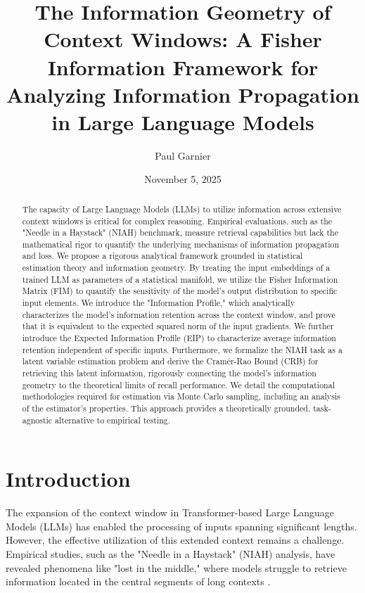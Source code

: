 \documentclass{article}
\title{The Information Geometry of Context Windows: A Fisher Information Framework for Analyzing Information Propagation in Large Language Models}
\author{Paul Garnier}
\affil{PSL}
\date{November 5, 2025}
\theoremstyle{definition}
\begin{document}
\maketitle

\begin{abstract}
The capacity of Large Language Models (LLMs) to utilize information across extensive context windows is critical for complex reasoning. Empirical evaluations, such as the "Needle in a Haystack" (NIAH) benchmark, measure retrieval capabilities but lack the mathematical rigor to quantify the underlying mechanisms of information propagation and loss. We propose a rigorous analytical framework grounded in statistical estimation theory and information geometry. By treating the input embeddings of a trained LLM as parameters of a statistical manifold, we utilize the Fisher Information Matrix (FIM) to quantify the sensitivity of the model's output distribution to specific input elements. We introduce the "Information Profile," which analytically characterizes the model's information retention across the context window, and prove that it is equivalent to the expected squared norm of the input gradients. We further introduce the Expected Information Profile (EIP) to characterize average information retention independent of specific inputs. Furthermore, we formalize the NIAH task as a latent variable estimation problem and derive the Cramér-Rao Bound (CRB) for retrieving this latent information, rigorously connecting the model's information geometry to the theoretical limits of recall performance. We detail the computational methodologies required for estimation via Monte Carlo sampling, including an analysis of the estimator's properties. This approach provides a theoretically grounded, task-agnostic alternative to empirical testing.
\end{abstract}

\section{Introduction}
The expansion of the context window in Transformer-based Large Language Models (LLMs) has enabled the processing of inputs spanning significant lengths. However, the effective utilization of this extended context remains a challenge. Empirical studies, such as the "Needle in a Haystack" (NIAH) analysis, have revealed phenomena like "lost in the middle," where models struggle to retrieve information located in the central segments of long contexts \cite{liu2023lost}.
\end{document}
